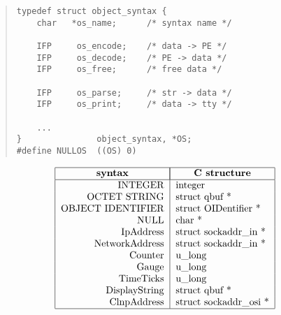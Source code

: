 \begin{bwslide}

\begin{quote}\small\begin{verbatim}
typedef struct object_syntax {
    char   *os_name;      /* syntax name */

    IFP     os_encode;    /* data -> PE */
    IFP     os_decode;    /* PE -> data */
    IFP     os_free;      /* free data */

    IFP     os_parse;     /* str -> data */
    IFP     os_print;     /* data -> tty */

    ...
}               object_syntax, *OS;
#define NULLOS  ((OS) 0)
\end{verbatim}\end{quote}
\end{bwslide}


\begin{bwslide}

\[\tt\begin{tabular}{|r|l|}
\hline
\multicolumn{1}{|c|}{\bf syntax}&
		\multicolumn{1}{|c|}{\bf C structure}\\
\hline
INTEGER&    		integer\\
OCTET STRING&		struct qbuf *\\
OBJECT IDENTIFIER&	struct OIDentifier *\\
NULL&			char *\\
IpAddress&		struct sockaddr\_in *\\
NetworkAddress&		struct sockaddr\_in *\\
Counter&		u\_long\\
Gauge&			u\_long\\
TimeTicks&		u\_long\\
DisplayString&		struct qbuf *\\
ClnpAddress&		struct sockaddr\_osi *\\
\hline
\end{tabular}\]
\end{bwslide}




